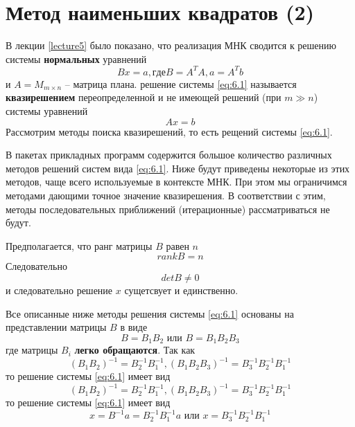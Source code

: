 \section{Метод наименьших квадратов (2)}

В лекции \ref{lecture5} было показано, что реализация МНК сводится к решению системы \textbf{нормальных} уравнений 
\begin{equation} \label{eq:6.1}
	Bx = a, где B = A^TA, a = A^Tb
\end{equation}
и $A=M_{m \times n}$  -- матрица плана. решение системы \ref{eq:6.1} называется \textbf{квазирешением} переопределенной и не имеющей решений (при $m\gg n$) системы уравнений 
\begin{equation} \label{eq:6.2}
	Ax = b
\end{equation}
Рассмотрим методы поиска квазирешений, то есть рещений системы \ref{eq:6.1}. 

В пакетах прикладных программ содержится большое количество различных методов решений систем вида \ref{eq:6.1}. Ниже будут приведены некоторые из этих методов, чаще всего используемые в контексте МНК. При этом мы ограничимся методами дающими точное значение квазирешения. В соответствии с этим, методы последовательных приближений (итерационные) рассматриваться не будут.

Предполагается, что ранг матрицы $B$ равен $n$
\begin{equation} \label{eq:6.3}
	rank B = n
\end{equation}
Следовательно
\begin{equation} \label{eq:6.4}
	det B \neq 0
\end{equation}
и следовательно решение $x$ сущетсвует и единственно.

Все описанные ниже методы решения системы \ref{eq:6.1} основаны на представлении матрицы $B$ в виде
\begin{equation} \label{eq:6.5}
	B = B_1 B_2 \text{ или } B = B_1 B_2 B_3
\end{equation}
где матрицы $B_i$ \textbf{легко обращаются}.
Так как
\begin{equation} \label{eq:6.6}
	(B_1B_2)^{-1} = B_2^{-1} B_1^{-1}, (B_1B_2B_3)^{-1} = B_3^{-1}B_2^{-1} B_1^{-1}
\end{equation}
то решение системы \ref{eq:6.1} имеет вид
\begin{equation} \label{eq:6.7}
	(B_1B_2)^{-1} = B_2^{-1} B_1^{-1}, (B_1B_2B_3)^{-1} = B_3^{-1}B_2^{-1} B_1^{-1}
\end{equation}
то решение системы \ref{eq:6.1} имеет вид
\begin{equation}
	x = B^{-1} a = B_2^{-1} B_1^{-1} a \text{ или } x = B_3^{-1}B_2^{-1} B_1^{-1}
\end{equation}

